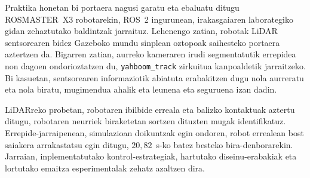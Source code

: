 Praktika honetan bi portaera nagusi garatu eta ebaluatu ditugu ROSMASTER~X3 robotarekin, ROS~2 ingurunean, irakasgaiaren laborategiko gidan zehaztutako baldintzak jarraituz. Lehenengo zatian, robotak LiDAR sentsorearen bidez Gazeboko mundu sinplean oztopoak saihesteko portaera aztertzen da. Bigarren zatian, aurreko kameraren irudi segmentatutik errepidea non dagoen ondorioztatzen du, \texttt{yahboom\_track} zirkuitua kanpoaldetik jarraitzeko. Bi kasuetan, sentsorearen informaziotik abiatuta erabakitzen dugu nola aurreratu eta nola biratu, mugimendua ahalik eta leunena eta seguruena izan dadin.

LiDARreko probetan, robotaren ibilbide erreala eta balizko kontaktuak aztertu ditugu, robotaren neurriek biraketetan sortzen dituzten mugak identifikatuz. Errepide-jarraipenean, simulazioan doikuntzak egin ondoren, robot errealean bost saiakera arrakastatsu egin ditugu, $20{,}82$~s-ko batez besteko bira-denborarekin. Jarraian, inplementatutako kontrol-estrategiak, hartutako diseinu-erabakiak eta lortutako emaitza esperimentalak zehatz azaltzen dira.
